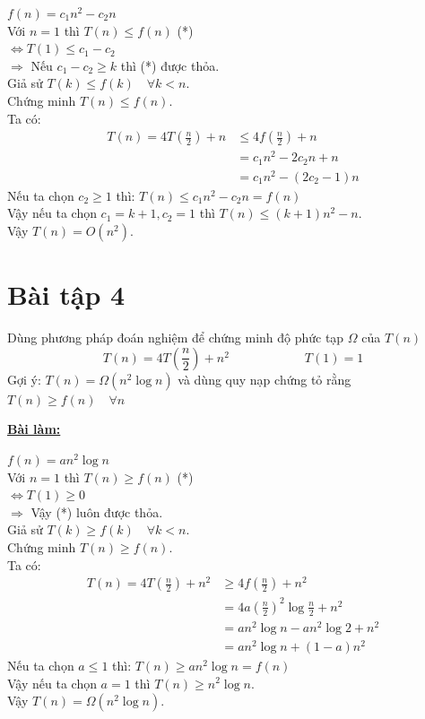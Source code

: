 \documentclass[12pt, a4paper, fleqn]{article}
\begin{document}
		\underline{$f(n) = c_1n^2 - c_2n$}\\
		Với $n = 1$ thì $T(n) \leq f(n)$ \hspace{100pt} (*)\\
		$\Leftrightarrow  T(1) \leq c_1 - c_2$\\
		$\Rightarrow$ Nếu $c_1 - c_2 \geq k$ thì (*) được thỏa.\\
		Giả sử $T(k) \leq f(k) \quad \forall k < n$.\\
		Chứng minh $T(n) \leq f(n)$.\\
		Ta có:
		\begin{align*}
		T(n) = 4T\left( \frac{n}{2} \right) + n &\leq 4f\left( \frac{n}{2}\right) + n\\
		&= c_1n^2 - 2c_2n + n\\
		&= c_1n^2 - (2c_2 - 1) n
		\end{align*}
		Nếu ta chọn $c_2 \geq 1$ thì: $T(n) \leq c_1n^2 - c_2n = f(n)$\\
		Vậy nếu ta chọn $c_1 = k + 1, c_2 = 1$ thì $T(n) \leq (k + 1)n^2 - n$.\\
		Vậy $T(n) = O(n^2)$.
		
	
	\clearpage
	
	\section*{Bài tập 4}
		Dùng phương pháp đoán nghiệm để chứng minh độ phức tạp $\Omega$ của $T(n)$
		$$T(n) = 4T\left( \frac{n}{2} \right) + n^2 \qquad\qquad\qquad T(1) = 1$$
		Gợi ý: $T(n) = \Omega (n^2 \log n)$ và dùng quy nạp chứng tỏ rằng $T(n) \geq f(n) \quad \forall n$
		
		\begin{center}
			\textbf{\underline{Bài làm:}}
		\end{center}
		
		$f(n) = an^2 \log n$\\
		Với $n = 1$ thì $T(n) \geq f(n)$ \hspace{100pt} (*)\\
		$\Leftrightarrow  T(1) \geq 0$\\
		$\Rightarrow$ Vậy (*) luôn được thỏa.\\
		Giả sử $T(k) \geq f(k) \quad \forall k < n$.\\
		Chứng minh $T(n) \geq f(n)$.\\
		Ta có:\
		\begin{align*}
		T(n) = 4T\left( \frac{n}{2} \right) + n^2 &\geq 4f\left( \frac{n}{2} \right) + n^2\\
		&= 4a \left( \frac{n}{2} \right) ^ 2 \log \frac{n}{2} + n^2\\
		&= an^2 \log n - an^2 \log 2 + n^2\\
		&= an^2 \log n + (1 - a)n^2
		\end{align*}
		Nếu ta chọn $a \leq 1$ thì: $T(n) \geq an^2 \log n = f(n)$\\
		Vậy nếu ta chọn $a = 1$ thì $T(n) \geq n^2 \log n$.\\
		Vậy $T(n) = \Omega (n^2 \log n)$.
	
\end{document}
